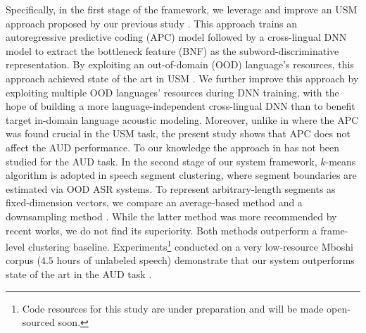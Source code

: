 \documentclass[a4paper]{article}
\begin{document}
Specifically, in the first stage of the framework, we leverage and   improve an USM approach  proposed by our previous study \cite{feng2020unsupervised}. This approach trains  an autoregressive predictive coding (APC)  model \cite{Chung2019} followed by a cross-lingual DNN model to  extract the bottleneck feature  (BNF)  as the   subword-discriminative representation. 
By exploiting an out-of-domain (OOD) language's resources, this approach achieved state of the art in USM \cite{feng2020unsupervised,feng2020effectiveness}. 
We further improve this approach by exploiting multiple OOD languages' resources during DNN  training, with the hope of building a more language-independent cross-lingual DNN than \cite{feng2020unsupervised} to benefit target in-domain language acoustic modeling.
Moreover, unlike in \cite{feng2020unsupervised} where the APC was found crucial in the USM task, the present study shows  that APC does not affect the AUD performance. To our knowledge the  approach in \cite{feng2020unsupervised} has not been studied for the AUD task.
In the second stage of our system framework,   $k$-means algorithm is adopted in speech segment clustering, where segment boundaries are estimated via OOD ASR systems. 
To represent arbitrary-length segments as fixed-dimension vectors, 
we compare  an average-based method \cite{I3EWang} and a downsampling method \cite{levin2013fixed}. 
While the latter method was more recommended by recent works, we do not find its superiority. 
Both methods outperform a frame-level clustering baseline.  
Experiments\footnote{Code resources for this study are under preparation and will be made open-sourced soon.} conducted  on a very low-resource Mboshi corpus  \cite{Godard2018mboshi} ($4.5$ hours of unlabeled speech)   demonstrate that our   system outperforms   state of the art in the AUD task \cite{Yusuf2020hierarchical,Ondel2019Bayesian}.
\end{document}
